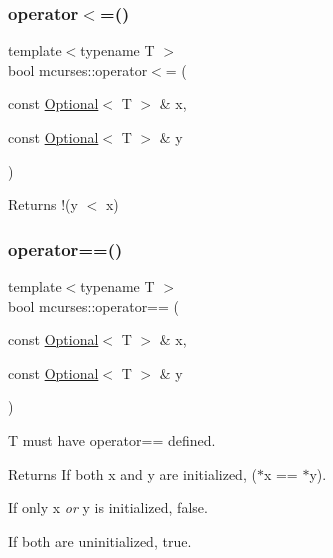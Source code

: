 \subsubsection{\texorpdfstring{operator$<$=()}{operator<=()}}
{\footnotesize\ttfamily template$<$typename T $>$ \\
bool mcurses\+::operator$<$= (\begin{DoxyParamCaption}\item[{const \hyperlink{classmcurses_1_1Optional}{Optional}$<$ T $>$ \&}]{x,  }\item[{const \hyperlink{classmcurses_1_1Optional}{Optional}$<$ T $>$ \&}]{y }\end{DoxyParamCaption})}

\begin{DoxyReturn}{Returns}
!(y $<$ x) 
\end{DoxyReturn}
\hypertarget{namespacemcurses_aa604611515dd88dd21ac8cb839588528}{}\label{namespacemcurses_aa604611515dd88dd21ac8cb839588528} 
\subsubsection{\texorpdfstring{operator==()}{operator==()}\hspace{0.1cm}{\footnotesize\ttfamily [1/3]}}
{\footnotesize\ttfamily template$<$typename T $>$ \\
bool mcurses\+::operator== (\begin{DoxyParamCaption}\item[{const \hyperlink{classmcurses_1_1Optional}{Optional}$<$ T $>$ \&}]{x,  }\item[{const \hyperlink{classmcurses_1_1Optional}{Optional}$<$ T $>$ \&}]{y }\end{DoxyParamCaption})}

T must have operator== defined. \begin{DoxyReturn}{Returns}
If both x and y are initialized, ($\ast$x == $\ast$y). 

If only x {\itshape or} y is initialized, false. 

If both are uninitialized, true. 
\end{DoxyReturn}
\hypertarget{namespacemcurses_a4b9e184df217e8cd040f1e006b074e2d}{}\label{namespacemcurses_a4b9e184df217e8cd040f1e006b074e2d} 
